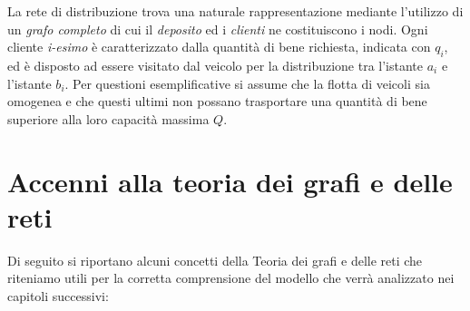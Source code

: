 La rete di distribuzione trova una naturale rappresentazione mediante l’utilizzo di un \emph{grafo completo} di cui il \emph{deposito} ed i \emph{clienti} ne costituiscono i nodi.
Ogni cliente \emph{i-esimo} è caratterizzato dalla quantità di bene richiesta, indicata con $q_i$, ed è disposto ad essere visitato dal veicolo per la distribuzione tra l’istante $a_i$ e l’istante $b_i$.
Per questioni esemplificative si assume che la flotta di veicoli sia omogenea e che questi ultimi non possano trasportare una quantità di bene superiore alla loro capacità massima $Q$.

\section{Accenni alla teoria dei grafi e delle reti} %
\label{sec:accenni_alla_teoria_dei_grafi_e_delle_reti}
	Di seguito si riportano alcuni concetti della Teoria dei grafi e delle reti che riteniamo utili per la corretta comprensione del modello che verrà analizzato nei capitoli successivi:

